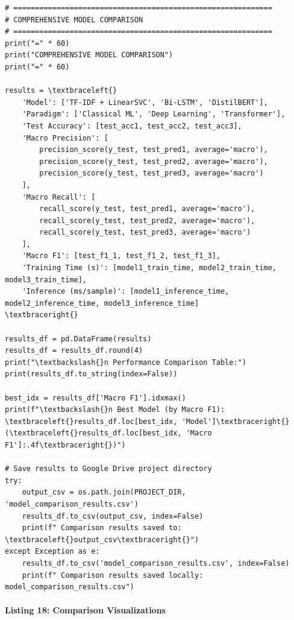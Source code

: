 \documentclass[12pt,a4paper,oneside]{report}
\begin{document}
\begin{Verbatim}[commandchars=\\\{\},breaklines=true,breakanywhere=true,fontsize=\scriptsize,frame=leftline,framesep=2mm,rulecolor=\color{gray}]
# ============================================================
# COMPREHENSIVE MODEL COMPARISON
# ============================================================
print("=" * 60)
print("COMPREHENSIVE MODEL COMPARISON")
print("=" * 60)

results = \textbraceleft{}
    'Model': ['TF-IDF + LinearSVC', 'Bi-LSTM', 'DistilBERT'],
    'Paradigm': ['Classical ML', 'Deep Learning', 'Transformer'],
    'Test Accuracy': [test_acc1, test_acc2, test_acc3],
    'Macro Precision': [
        precision_score(y_test, test_pred1, average='macro'),
        precision_score(y_test, test_pred2, average='macro'),
        precision_score(y_test, test_pred3, average='macro')
    ],
    'Macro Recall': [
        recall_score(y_test, test_pred1, average='macro'),
        recall_score(y_test, test_pred2, average='macro'),
        recall_score(y_test, test_pred3, average='macro')
    ],
    'Macro F1': [test_f1_1, test_f1_2, test_f1_3],
    'Training Time (s)': [model1_train_time, model2_train_time, model3_train_time],
    'Inference (ms/sample)': [model1_inference_time, model2_inference_time, model3_inference_time]
\textbraceright{}

results_df = pd.DataFrame(results)
results_df = results_df.round(4)
print("\textbackslash{}n Performance Comparison Table:")
print(results_df.to_string(index=False))

best_idx = results_df['Macro F1'].idxmax()
print(f"\textbackslash{}n Best Model (by Macro F1): \textbraceleft{}results_df.loc[best_idx, 'Model']\textbraceright{} (\textbraceleft{}results_df.loc[best_idx, 'Macro F1']:.4f\textbraceright{})")

# Save results to Google Drive project directory
try:
    output_csv = os.path.join(PROJECT_DIR, 'model_comparison_results.csv')
    results_df.to_csv(output_csv, index=False)
    print(f" Comparison results saved to: \textbraceleft{}output_csv\textbraceright{}")
except Exception as e:
    results_df.to_csv('model_comparison_results.csv', index=False)
    print(f" Comparison results saved locally: model_comparison_results.csv")
\end{Verbatim}
\paragraph{Listing 18: Comparison Visualizations}\mbox{}\\[-1ex]
\end{document}
